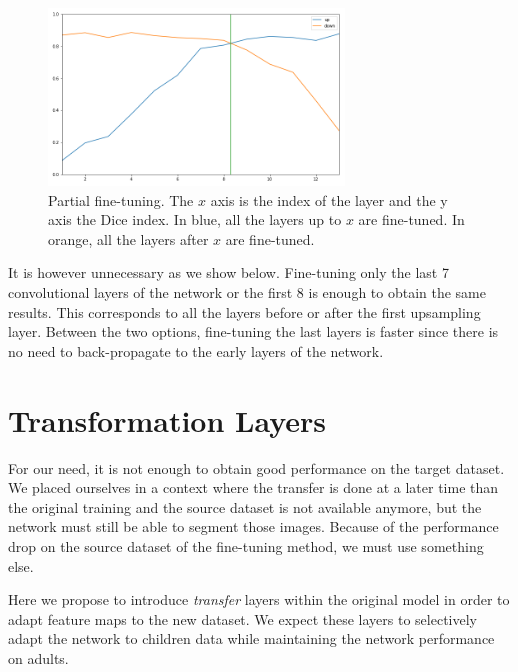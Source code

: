 \begin{figure}[htbp]
    \centering
	\includegraphics[width=0.7\textwidth]{img_transfer/partial_transfer}
    \caption[Partial fine-tuning]{Partial fine-tuning. The $x$ axis is the index of the layer and the y axis the Dice index. In blue, all the layers up to $x$ are fine-tuned. In orange, all the layers after $x$ are fine-tuned.}
    \label{fig:partial_transfer}
\end{figure}

It is however unnecessary as we show below. Fine-tuning only the last 7 convolutional layers of the network or the first 8 is enough to obtain the same results. This corresponds to all the layers before or after the first upsampling layer. Between the two options, fine-tuning the last layers is faster since there is no need to back-propagate to the early layers of the network.

\section{Transformation Layers}
\label{sec:transfo}

For our need, it is not enough to obtain good performance on the target dataset. We placed ourselves in a context where the transfer is done at a later time than the original training and the source dataset is not available anymore, but the network must still be able to segment those images. Because of the performance drop on the source dataset of the fine-tuning method, we must use something else.

Here we propose to introduce \textit{transfer} layers within the original model in order to adapt feature maps to the new dataset. We expect these layers to selectively adapt the network to children data while maintaining the network performance on adults.


